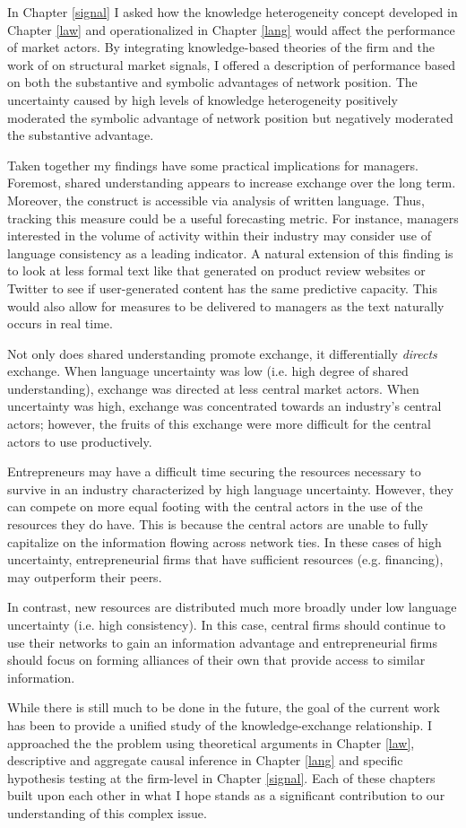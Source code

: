 In Chapter \ref{signal} I asked how the knowledge heterogeneity concept developed in Chapter \ref{law} and operationalized in Chapter \ref{lang} would affect the performance of market actors. By integrating knowledge-based theories of the firm \citep[e.g.][]{powell1996} and the work of \citet{podolny2005} on structural market signals, I offered a description of performance based on both the substantive and symbolic advantages of network position. The uncertainty caused by high levels of knowledge heterogeneity positively moderated the symbolic advantage of network position but negatively moderated the substantive advantage.

Taken together my findings have some practical implications for managers. Foremost, shared understanding appears to increase exchange over the long term. Moreover, the construct is accessible via analysis of written language. Thus, tracking this measure could be a useful forecasting metric. For instance, managers interested in the volume of activity within their industry may consider use of language consistency as a leading indicator. A natural extension of this finding is to look at less formal text like that generated on product review websites or Twitter to see if user-generated content has the same predictive capacity. This would also allow for measures to be delivered to managers as the text naturally occurs in real time.

Not only does shared understanding promote exchange, it differentially \emph{directs} exchange. When language uncertainty was low (i.e. high degree of shared understanding), exchange was directed at less central market actors. When uncertainty was high, exchange was concentrated towards an industry's central actors; however, the fruits of this exchange were more difficult for the central actors to use productively. 

Entrepreneurs may have a difficult time securing the resources necessary to survive in an industry characterized by high language uncertainty. However, they can compete on more equal footing with the central actors in the use of the resources they do have. This is because the central actors are unable to fully capitalize on the information flowing across network ties. In these cases of high uncertainty, entrepreneurial firms that have sufficient resources (e.g. financing), may outperform their peers.

In contrast, new resources are distributed much more broadly under low language uncertainty (i.e. high consistency). In this case, central firms should continue to use their networks to gain an information advantage and entrepreneurial firms should focus on forming alliances of their own that provide access to similar information.

While there is still much to be done in the future, the goal of the current work has been to provide a unified study of the knowledge-exchange relationship. I approached the the problem using theoretical arguments in Chapter \ref{law}, descriptive and aggregate causal inference in Chapter \ref{lang} and specific hypothesis testing at the firm-level in Chapter \ref{signal}. Each of these chapters built upon each other in what I hope stands as a significant contribution to our understanding of this complex issue.

